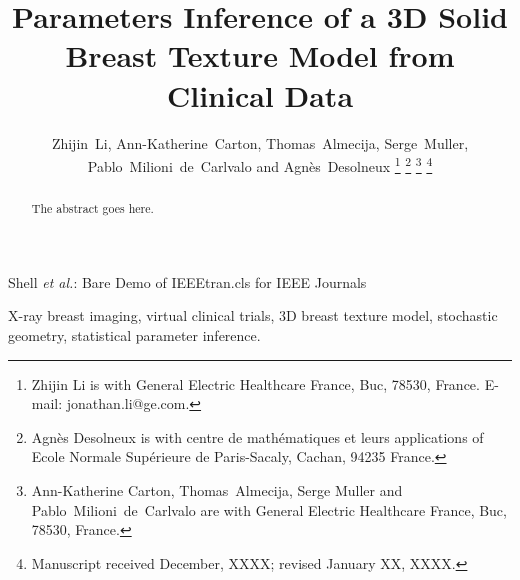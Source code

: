 \documentclass[journal]{IEEEtran}
\begin{document}
\title{Parameters Inference of a 3D Solid Breast Texture Model from
  Clinical Data}

\author{Zhijin~Li, Ann-Katherine~Carton, Thomas~Almecija,
  Serge~Muller, Pablo~Milioni~de~Carlvalo and
  Agnès~Desolneux%
  \thanks{Zhijin Li is with General Electric Healthcare France, Buc,
    78530, France. E-mail:
    jonathan.li@ge.com.}%
  \thanks{Agnès Desolneux is with centre de math\'{e}matiques et leurs
    applications of Ecole Normale Sup\'{e}rieure de Paris-Sacaly,
    Cachan, 94235 France.}%
  \thanks{Ann-Katherine Carton, Thomas~Almecija, Serge Muller and
    Pablo~Milioni~de~Carlvalo are with General Electric Healthcare
    France, Buc, 78530, France.}%
  \thanks{Manuscript received December, XXXX; revised January XX,
    XXXX.}}

%
{Shell \MakeLowercase{\textit{et al.}}: Bare Demo of IEEEtran.cls for
  IEEE Journals}
%



\maketitle

\begin{abstract}
  The abstract goes here.
\end{abstract}

\begin{IEEEkeywords}
  X-ray breast imaging, virtual clinical trials, 3D breast texture
  model, stochastic geometry, statistical parameter inference.
\end{IEEEkeywords}
\end{document}
